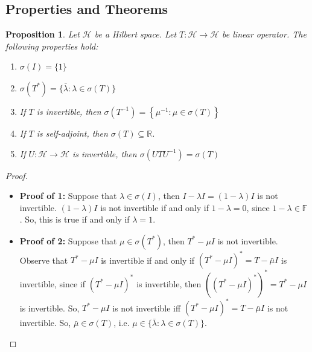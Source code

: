 \documentclass{beamer}
\newtheorem{prop}{Proposition}
\begin{document}
  \subsection{Properties and Theorems}
  \begin{frame}{\subsecname}
    \begin{prop}
      Let $\mathcal{H}$ be a Hilbert space. Let $T:\mathcal{H}\to\mathcal{H}$ be linear operator. The following properties hold:
      \begin{enumerate}
        \item $\sigma(I) = \{1\}$
        \pause
        \item $\sigma\left(T^{*}\right)=\{\bar{\lambda}: \lambda \in \sigma(T)\}$
        \pause
        \item If $T$ is invertible, then $\sigma\left(T^{-1}\right)=\left\{\mu^{-1}: \mu \in \sigma(T)\right\}$
        \pause
        \item If $T$ is self-adjoint, then $\sigma(T)\subseteq\mathbb{R}$.
        \pause
        \item If $U:\mathcal{H}\to\mathcal{H}$ is invertible, then $\sigma(UTU^{-1})=\sigma(T)$
      \end{enumerate}
    \end{prop}
  \end{frame}

  \begin{frame}{\subsecname}
    \begin{proof}
      \begin{itemize}
        \item\textbf{Proof of 1:} Suppose that $\lambda\in\sigma(I)$, then $I-\lambda I=(1-\lambda)I$ is not invertible. $(1-\lambda)I$ is not invertible if and only if $1-\lambda=0$, since $1-\lambda\in\mathbb{F}$. So, this is true if and only if $\lambda=1$.
          \pause

        \item\textbf{Proof of 2:} Suppose that $\mu\in\sigma(T^{*})$, then $T^{*}-\mu I$ is not invertible. Observe that $T^{*}-\mu I$ is invertible if and only if $(T^{*}-\mu I)^{*}=T-\bar{\mu}I$ is invertible, since if $(T^{*}-\mu I)^{*}$ is invertible, then $((T^{*}-\mu I)^{*})^{*}=T^{*}-\mu I$ is invertible. So, $T^{*}-\mu I$ is not invertible iff $(T^{*}-\mu I)^{*}=T-\bar{\mu}I$ is not invertible. So, $\bar{\mu}\in\sigma(T)$, i.e. $\mu\in\{\bar{\lambda}: \lambda\in\sigma(T)\}$.
        \end{itemize}
      \end{proof}
    \end{frame}
\end{document}
